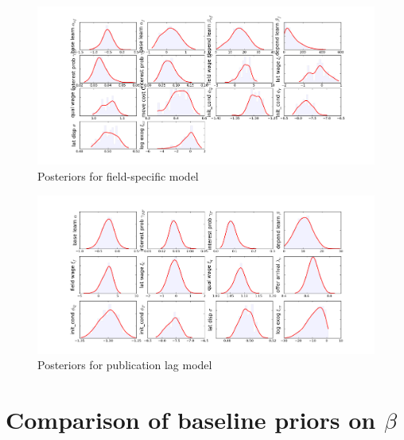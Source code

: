 \documentclass[]{article}
\makeatletter
\def\maxwidth{\ifdim\Gin@nat@width>\linewidth\linewidth
\else\Gin@nat@width\fi}
\let\Oldincludegraphics\includegraphics
\renewcommand{\includegraphics}[1]{\Oldincludegraphics[width=\maxwidth]{#1}}
\makeatother
\begin{document}
\begin{figure}[h!]
    \includegraphics{pics/params_dists_split.png}
    \caption{Posteriors for field-specific model}
\end{figure}

\begin{figure}[h!]
    \includegraphics{pics/params_dists_lag.png}
    \caption{Posteriors for publication lag model}
\end{figure}

\clearpage 

\section{Comparison of baseline priors on $\beta$} 
\label{sec:prior_comp}
\end{document}
